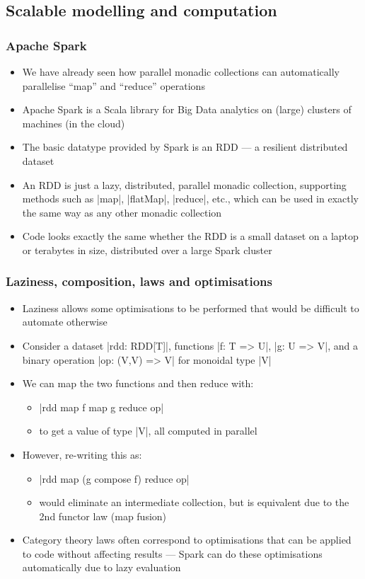 \documentclass[mathserif,handout]{beamer}
\begin{document}
\subsection{Scalable modelling and computation}

\begin{frame}[fragile]
  \frametitle{Apache Spark}
  \begin{itemize}
  \item We have already seen how parallel monadic collections can automatically parallelise ``map'' and ``reduce'' operations
  \item \alert{Apache Spark} is a Scala library for Big Data analytics on (large) clusters of machines (in the cloud)
  \item The basic datatype provided by Spark is an \alert{RDD} --- a resilient distributed dataset
  \item An RDD is just a \alert{lazy}, \alert{distributed}, parallel monadic collection, supporting methods such as |map|, |flatMap|, |reduce|, etc., which can be used in exactly the same way as any other monadic collection
    \item Code looks exactly the same whether the RDD is a small dataset on a laptop or terabytes in size, distributed over a large Spark cluster
  \end{itemize}
\end{frame}

\begin{frame}[fragile]
  \frametitle{Laziness, composition, laws and optimisations}
  \begin{itemize}
    \item Laziness allows some optimisations to be performed that would be difficult to automate otherwise
    \item Consider a dataset |rdd: RDD[T]|, functions |f: T => U|, |g: U => V|, and a binary operation |op: (V,V) => V| for monoidal type |V|
    \item We can map the two functions and then reduce with:
      \begin{itemize}
      \item |rdd map f map g reduce op|
        \item to get a value of type |V|, all computed in parallel
      \end{itemize}
    \item However, re-writing this as:
      \begin{itemize}
      \item |rdd map (g compose f) reduce op|
        \item would eliminate an intermediate collection, but is equivalent due to the 2nd functor law (\alert{map fusion})
      \end{itemize}
      \item Category theory \alert{laws} often correspond to \alert{optimisations} that can be applied to code without affecting results --- Spark can do these optimisations \alert{automatically} due to lazy evaluation
  \end{itemize}
\end{frame}
\end{document}
